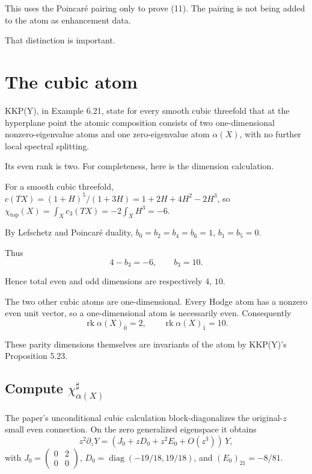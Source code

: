 \documentclass[11pt]{article}
\theoremstyle{definition}
\theoremstyle{remark}
\begin{document}
This uses the Poincar\'e pairing only to prove (11). The pairing is not being
added to the atom as enhancement data.

That distinction is important.

\section{The cubic atom}

KKP(Y), in Example 6.21, state for every smooth cubic threefold that at the
hyperplane point the atomic composition consists of two one-dimensional
nonzero-eigenvalue atoms and one zero-eigenvalue atom $\alpha(X)$, with no
further local spectral splitting.

Its even rank is two. For completeness, here is the dimension calculation.

For a smooth cubic threefold, $c(TX)=(1+H)^5/(1+3H)=1+2H+4H^2-2H^3$, so
$\chi_{\mathrm{top}}(X)=\int_Xc_3(TX)=-2\int_XH^3=-6$.

By Lefschetz and Poincar\'e duality, $b_0=b_2=b_4=b_6=1$, $b_1=b_5=0$.

Thus
\begin{equation}
  4-b_3=-6,\qquad b_3=10.
  \tag{31}
\end{equation}

Hence total even and odd dimensions are respectively $4$, $10$.

The two other cubic atoms are one-dimensional. Every Hodge atom has a nonzero
even unit vector, so a one-dimensional atom is necessarily even. Consequently
\begin{equation}
  \operatorname{rk}\alpha(X)_{\bar0}=2,\qquad
  \operatorname{rk}\alpha(X)_{\bar1}=10.
  \tag{32}
\end{equation}

These parity dimensions themselves are invariants of the atom by KKP(Y)'s
Proposition 5.23.

\subsection*{Compute $\chi^\sharp_{\alpha(X)}$}

The paper's unconditional cubic calculation block-diagonalizes the original-$z$
small even connection. On the zero generalized eigenspace it obtains
\[
  z^2\partial_zY=(J_0+zD_0+z^2E_0+O(z^3))\,Y,
\]
with $J_0=\begin{pmatrix}0&2\\0&0\end{pmatrix}$,
$D_0=\operatorname{diag}(-19/18,19/18)$, and $(E_0)_{21}=-8/81$.
\end{document}
